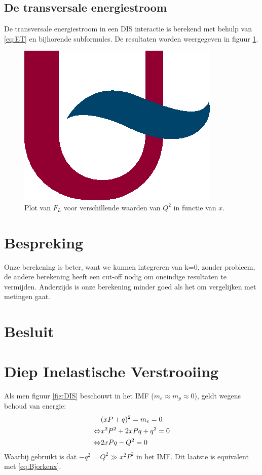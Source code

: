\documentclass[a4paper,11pt]{article}
\numberwithin{equation}{section} %
\begin{document}
  \subsection{De transversale energiestroom} \label{sec:ResET}
De transversale energiestroom in een DIS interactie is berekend met behulp van \eqref{eq:ET} en bijhorende subformules.
De resultaten worden weergegeven in figuur \ref{fig:ResET}.
\begin{figure} [H]
  \begin{center}
    \includegraphics[scale=1]{Afbeeldingen/Placeholder.eps}
    \caption{Plot van $F_L$ voor verschillende waarden van $Q^2$ in functie van $x$.}
   \label{fig:ResET}
  \end{center}
\end{figure}

\section{Bespreking}
Onze berekening is beter, want we kunnen integreren van k=0, zonder probleem, de andere berekening heeft een cut-off nodig om oneindige resultaten te vermijden.
Anderzijds is onze berekening minder goed als het om vergelijken met metingen gaat.


\section{Besluit}



\newpage
\appendix
\section{Diep Inelastische Verstrooiing} \label{app:DIS}
Als men figuur \ref{fig:DIS} beschouwt in het IMF ($m_e \approx m_p \approx 0$), geldt wegens behoud van energie:
\begin{align}
&(xP+q)^2 = m_e = 0 \notag \\
\Leftrightarrow &x^2 P^2 + 2xPq + q^2 = 0 \notag \\
\Leftrightarrow &2xPq -Q^2=0
\end{align}
Waarbij gebruikt is dat $-q^2 = Q^2 \gg x^2P^2$ in het  IMF. Dit laatste is equivalent met \eqref{eq:Bjorkenx}.
\end{document}
